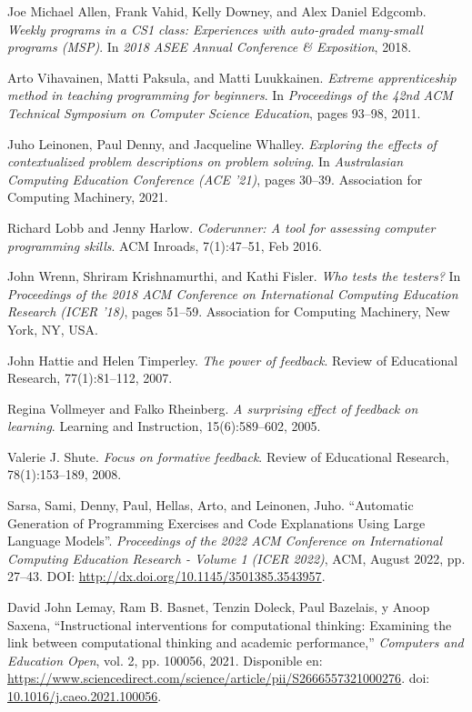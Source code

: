 \documentclass{article}
\begin{document}
\begin{thebibliography}{99}
Joe Michael Allen, Frank Vahid, Kelly Downey, and Alex Daniel Edgcomb.
\textit{Weekly programs in a CS1 class: Experiences with auto-graded many-small programs (MSP)}.
In \textit{2018 ASEE Annual Conference \& Exposition}, 2018.

Arto Vihavainen, Matti Paksula, and Matti Luukkainen.
\textit{Extreme apprenticeship method in teaching programming for beginners}.
In \textit{Proceedings of the 42nd ACM Technical Symposium on Computer Science Education}, pages 93--98, 2011.

Juho Leinonen, Paul Denny, and Jacqueline Whalley.
\textit{Exploring the effects of contextualized problem descriptions on problem solving}.
In \textit{Australasian Computing Education Conference (ACE '21)}, pages 30--39. Association for Computing Machinery, 2021.

Richard Lobb and Jenny Harlow.
\textit{Coderunner: A tool for assessing computer programming skills}.
ACM Inroads, 7(1):47--51, Feb 2016.

John Wrenn, Shriram Krishnamurthi, and Kathi Fisler.
\textit{Who tests the testers?}
In \textit{Proceedings of the 2018 ACM Conference on International Computing Education Research (ICER '18)}, pages 51--59. Association for Computing Machinery, New York, NY, USA.

John Hattie and Helen Timperley.
\textit{The power of feedback}.
Review of Educational Research, 77(1):81--112, 2007.

Regina Vollmeyer and Falko Rheinberg.
\textit{A surprising effect of feedback on learning}.
Learning and Instruction, 15(6):589--602, 2005.

Valerie J. Shute.
\textit{Focus on formative feedback}.
Review of Educational Research, 78(1):153--189, 2008.

 Sarsa, Sami, Denny, Paul, Hellas, Arto, and Leinonen, Juho. ``Automatic Generation of Programming Exercises and Code Explanations Using Large Language Models''. \textit{Proceedings of the 2022 ACM Conference on International Computing Education Research - Volume 1 (ICER 2022)}, ACM, August 2022, pp. 27–43. DOI: \url{http://dx.doi.org/10.1145/3501385.3543957}.

David John Lemay, Ram B. Basnet, Tenzin Doleck, Paul Bazelais, y Anoop Saxena, 
``Instructional interventions for computational thinking: Examining the link between computational thinking and academic performance,'' 
\textit{Computers and Education Open}, vol. 2, pp. 100056, 2021. 
Disponible en: \url{https://www.sciencedirect.com/science/article/pii/S2666557321000276}. 
doi: \href{https://doi.org/10.1016/j.caeo.2021.100056}{10.1016/j.caeo.2021.100056}.


\end{thebibliography}
\end{document}
